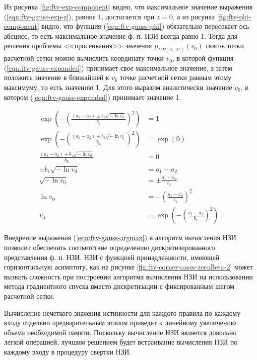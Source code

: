 Из рисунка \cref{fig:ftv-exp-component} видно, что максимальное значение выражения (\ref{eqn:ftv-gauss-exp-z}), равное 1, достигается при $z = 0$, а из рисунка \cref{fig:ftv-phi-component} видно, что функция (\ref{eqn:ftv-gauss-phi}) обязательно пересекает ось абсцисс, то есть максимальное значение ф. п. НЗИ всегда равно 1. Тогда для решения проблемы <<просеивания>> значения $\mu_{CP(A, A')}(v_0)$ сквозь точки расчетной сетки можно вычислить координату точки $v_0$, в которой функция (\ref{eqn:ftv-gauss-expanded}) принимает свое максимальное значение, а затем положить значение в ближайшей к $v_0$ точке расчетной сетки равным этому максимуму, то есть значению 1. Для этого выразим аналитически значение $v_0$, в котором (\ref{eqn:ftv-gauss-expanded}) принимает значение 1.

\begin{align}
	\exp\left(-\left(\frac{(a_1-a_2)\pm b_1\sqrt{-\ln v_0}}{b_2}\right)^2\right) &= 1 \nonumber \\
	\exp\left(-\left(\frac{(a_1-a_2)\pm b_1\sqrt{-\ln v_0}}{b_2}\right)^2\right) &= \exp(0) \nonumber \\
	\frac{(a_1-a_2)\pm b_1\sqrt{-\ln v_0}}{b_2} &= 0 \nonumber \\
	\pm b_1\sqrt{-\ln v_0} &= a_1-a_2 \nonumber \\
	\sqrt{-\ln v_0} &= \pm\frac{a_1-a_2}{b_1} \nonumber \\
	\ln v_0 &= -\left(\frac{a_1-a_2}{b_1}\right)^2 \nonumber \\
	v_0 &= \exp\left(-\left(\frac{a_1-a_2}{b_1}\right)^2\right) \label{eqn:ftv-gauss-argmax}
\end{align}

Внедрение выражения (\ref{eqn:ftv-gauss-argmax}) в алгоритм вычисления НЗИ позволит обеспечить соответствие определению дискретизированного представления ф. п. НЗИ.  НЗИ с функцией принадлежности, имеющей горизонтальную асимптоту, как на рисунке \cref{fig:ftv-corner-cases-zeroBeta-2} может вызвать сложность при построении алгоритма вычисления НЗИ на использовании метода градиентного спуска вместо дискретизации с фиксированным шагом расчетной сетки.

Вычисление нечеткого значения истинности для каждого правила по каждому входу отдельно предварительным этапом приведет к линейному увеличению объема необходимой памяти. Поскольку вычисление НЗИ является довольно легкой операцией, лучшим решением будет встраивание вычисления НЗИ по каждому входу в процедуру свертки НЗИ.

